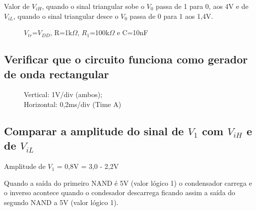 \documentclass[pdftex,12pt,a4paper]{report}
\begin{document}
Valor de $V_{iH}$, quando o sinal triangular sobe o $V_0$ passa de 1 para 0, aos 4V e de $V_{iL}$, quando o sinal triangular desce o $V_0$ passa de 0 para 1 aos 1,4V.

\newpage
\begin{figure}[h]
  \centerline{}
  \caption{$V_{tr}$=$V_{DD}$, R=1k$\Omega$, $R_1$=100k$\Omega$ e C=10nF}\label{cmos}
\end{figure}

\subsection{Verificar que o circuito funciona como gerador de onda rectangular}

\begin{figure}[h]
  \centerline{}
  \caption{Vertical: 1V/div (ambos); \\Horizontal: 0,2ms/div (Time A)}\label{cmos}
\end{figure}

\subsection{Comparar a amplitude do sinal de $V_1$ com $V_{iH}$ e de $V_{iL}$}

Amplitude de $V_1$ = 0,8V = 3,0 - 2,2V

Quando a saída do primeiro NAND é 5V (valor lógico 1) o condensador carrega e o inverso acontece quando o condesador descarrega ficando assim a saída do segundo NAND a 5V (valor lógico 1).
\end{document}
